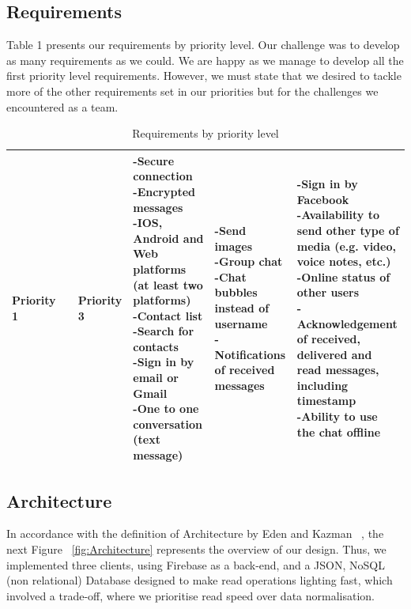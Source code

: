 
\subsection{Requirements}

Table 1 presents our requirements by priority level. Our challenge was to develop as many requirements as we could. We are happy as we manage to develop all the first priority  level requirements. However, we must state that we desired to tackle more of the other requirements set in our priorities but for the challenges we encountered as a team.

\begin{table}[ht]
\caption{Requirements by priority level}
\label{tab:requirements}
    \begin{tabular}[c]{ | p{5cm} | p{5cm} | p{5cm} |}
		\hline
		\centering\textbf{Priority 1} &  & \centering\textbf{Priority 3} &
    \hline
    \parbox[t]{5cm}{-Secure connection\\-Encrypted messages\\ -IOS, Android and Web platforms (at least two platforms)\\ -Contact list\\ -Search for contacts\\ -Sign in by email or Gmail \\ -One to one conversation (text message)} &  \parbox[t]{5cm}{-Send images\\ -Group chat\\ -Chat bubbles instead of username\\ -Notifications of received messages}
& \parbox[t]{5cm}{-Sign in by Facebook\\ -Availability to send other type of media (e.g. video, voice notes, etc.)\\ -Online status of other users\\ -Acknowledgement of received, delivered and read messages, including timestamp\\ -Ability to use the chat offline}\\
    \hline
    \end{tabular}
\end{table}


\subsection{Architecture}

In accordance with the definition of Architecture by Eden and Kazman ~\cite{eden2003architecture}, the next Figure  ~\ref{fig:Architecture}  represents the overview of our design. Thus, we implemented three clients, using Firebase as a back-end, and a JSON, NoSQL (non relational) Database designed to make read operations lighting fast, which involved a trade-off, where we prioritise read speed over data normalisation.


